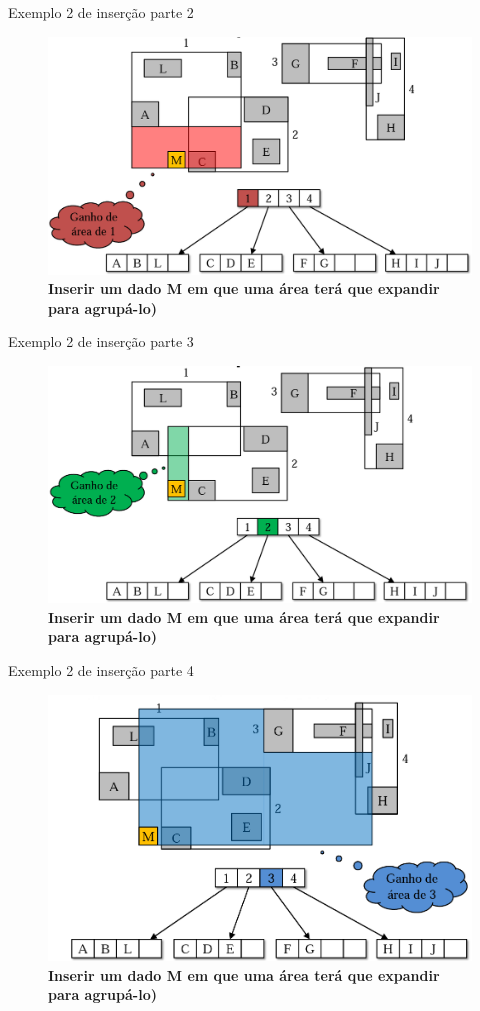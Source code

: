 \documentclass[compress,aspectratio=169]{beamer}
\begin{document}
\begin{frame}{Exemplo 2 de inserção parte 2}
\begin{figure}[] 
        \centering
        \includegraphics[width=0.65\linewidth]{insercao4.png}
        \caption{\textbf{Inserir um dado M em que uma área terá que expandir para agrupá-lo)}}
        \label{fig:enter-label}  
\end{figure}
\end{frame}

\begin{frame}{Exemplo 2 de inserção parte 3}
\begin{figure}[] 
        \centering
        \includegraphics[width=0.65\linewidth]{insercao5.png}
        \caption{\textbf{Inserir um dado M em que uma área terá que expandir para agrupá-lo)}}
        \label{fig:enter-label}  
\end{figure}
\end{frame}

\begin{frame}{Exemplo 2 de inserção parte 4}
\begin{figure}[] 
        \centering
        \includegraphics[width=0.65\linewidth]{insercao6.png}
        \caption{\textbf{Inserir um dado M em que uma área terá que expandir para agrupá-lo)}}
        \label{fig:enter-label}  
\end{figure}
\end{frame}
\end{document}

